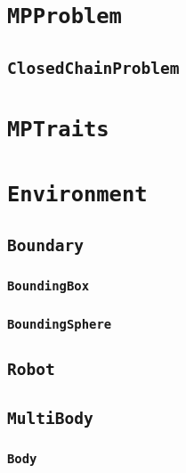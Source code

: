 \section{\texttt{MPProblem}}

\subsection{\texttt{ClosedChainProblem}}

\section{\texttt{MPTraits}}

\section{\texttt{Environment}}

\subsection{\texttt{Boundary}}

\subsubsection{\texttt{BoundingBox}}

\subsubsection{\texttt{BoundingSphere}}

\subsection{\texttt{Robot}}

\subsection{\texttt{MultiBody}}

\subsubsection{\texttt{Body}}

